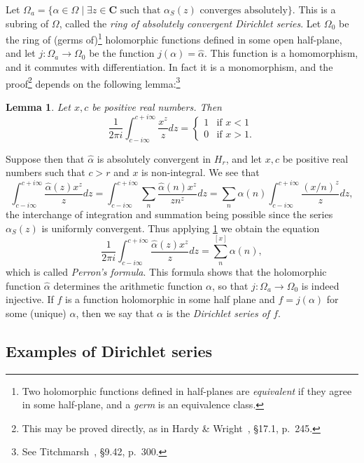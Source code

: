 \documentclass[10pt,leqno]{article}
\newtheorem{lemm}[theo]{Lemma}
\theoremstyle{definition}
\def\CC{\mathbf{C}}
\def\fnfi{Two holomorphic functions defined in half-planes are \emph{equivalent} if they agree in some half-plane, and a \emph{germ} is an equivalence class.}
\def\fnsi{This may be proved directly, as in Hardy \& Wright~\cite{bib:86}, \S17.1, p.~245.}
\def\fnse{See Titchmarsh~\cite{bib:194}, \S9.42, p.~300.}
\begin{document}
Let $\Omega_a = \{ \alpha \in \Omega \mid \text{$\exists z \in \CC$ such that $\alpha_S(z)$ converges absolutely} \}$.
This is a subring of $\Omega$, called the \emph{ring of absolutely convergent Dirichlet series}.
Let $\Omega_0$ be the ring of (germs of)\footnote{\fnfi} holomorphic functions defined in some open half-plane, and let $j : \Omega_a \to \Omega_0$ be the function $j(\alpha) = \widehat\alpha$.
This function is a homomorphism, and it commutes with differentiation.
In fact it is a monomorphism, and the proof\footnote{\fnsi} depends on the following lemma:\footnote{\fnse}


\begin{lemm}
\label{1.2.1}
Let $x,c$ be positive real numbers.
Then
\[
\frac{1}{2\pi i} \int_{c - i \infty}^{c + i\infty} \frac{x^z}{z} dz
= \begin{cases}
1 & \text{if $x < 1$}
\\
0 & \text{if $x > 1$}.
\end{cases}
\]
\end{lemm}


Suppose then that $\widehat\alpha$ is absolutely convergent in $H_r$, and let $x,c$ be positive real numbers such that $c > r$ and $x$ is non-integral.
We see that
\[
\int_{c - i\infty}^{c + i\infty} \frac{\widehat\alpha(z) x^z}{z} dz
= \int_{c - i\infty}^{c + i\infty} \sum_n \frac{\widehat\alpha(n) x^z}{z n^z} dz
= \sum_n \alpha(n) \int_{c - i\infty}^{c + i\infty} \frac{(x/n)^z}{z} dz,
\]
the interchange of integration and summation being possible since the series $\alpha_S(z)$ is uniformly convergent.
Thus applying \ref{1.2.1} we obtain the equation
\[
\frac{1}{2\pi i} 
\int_{c-i\infty}^{c+i\infty} \frac{\widehat\alpha(z) x^z}{z} dz
= \sum_n^{[x]} \alpha(n),
\]
which is called \emph{Perron's formula}.
This formula shows that the holomorphic function $\widehat\alpha$ determines the arithmetic function $\alpha$, so that $j : \Omega_a \to \Omega_0$ is indeed injective.
If $f$ is a function holomorphic in some half plane and $f = j(\alpha)$ for some (unique) $\alpha$, then we say that $\alpha$ is the \emph{Dirichlet series of $f$}.


\subsection{Examples of Dirichlet series}
\label{ch:1.3}
\end{document}

